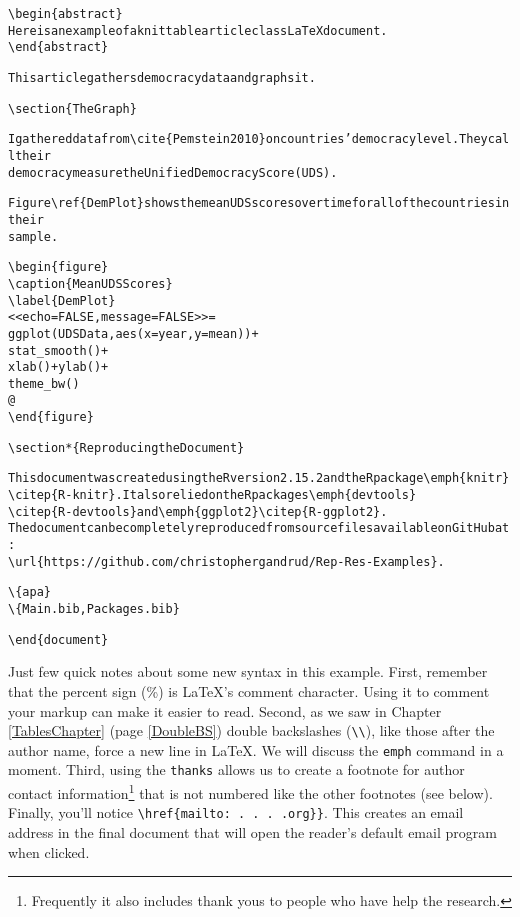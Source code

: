 {\begin{knitrout}
\begin{kframe}
\begin{alltt}
%%%%%%%%%%%%% Abstract %%%%%%%%%%%%%%%%%%%%
\textbackslash{}begin\{abstract\}
  Here is an example of a knittable article class LaTeX document.
\textbackslash{}end\{abstract\}

%%%%%%%%%%% Article Main Text %%%%%%%%%%%%%
This article gathers democracy data and graphs it. 

\textbackslash{}section\{The Graph\} 

I gathered data from \textbackslash{}cite\{Pemstein2010\} on countries' democracy level. They call their 
democracy measure the Unified Democracy Score (UDS).

Figure \textbackslash{}ref\{DemPlot\} shows the mean UDS scores over time for all of the countries in their 
sample.

\textbackslash{}begin\{figure\}
    \textbackslash{}caption\{Mean UDS Scores\}
    \textbackslash{}label\{DemPlot\}
\textless{}\textless{}echo=FALSE, message=FALSE\textgreater{}\textgreater{}=
ggplot(UDSData, aes(x = year, y = mean)) +
        stat_smooth() +
        xlab() + ylab() +
        theme\_bw()
@
\textbackslash{}end\{figure\}

%%%%%%%%%%%%% Reproducing the Document %%%%%%%%%%%%%
\textbackslash{}section*\{Reproducing the Document\}

This document was created using the R version 2.15.2 and the R package \textbackslash{}emph\{knitr\} 
\textbackslash{}citep\{R-knitr\}. It also relied on the R packages \textbackslash{}emph\{devtools\} 
\textbackslash{}citep\{R-devtools\} and \textbackslash{}emph\{ggplot2\} \textbackslash{}citep\{R-ggplot2\}. 
The document can be completely reproduced from source files available on GitHub at: 
\textbackslash{}url\{https://github. com/christophergandrud/Rep-Res-Examples\}.

%%%%%%%%% Bibliography %%%%%%%%%%%%%%%%%%%%
\textbackslash{}\{apa\}
\textbackslash{}\{Main.bib,Packages.bib\}

\textbackslash{}end\{document\}
        \end{alltt}
\end{kframe}
\end{knitrout}
}

\noindent Just few quick notes about some new syntax in this example. First, remember that the percent sign (\%) is LaTeX's comment character. Using it to comment your markup can make it easier to read. Second, as we saw in Chapter \ref{TablesChapter} (page \ref{DoubleBS}) double backslashes (\verb|\\|), like those after the author name, force a new line in LaTeX. We will discuss the \texttt{emph} command in a moment. Third, using the \texttt{thanks} allows us to create a footnote for author contact information\footnote{Frequently it also includes thank yous to people who have help the research.} that is not numbered like the other footnotes (see below). Finally, you'll notice \verb|\href{mailto: . . . .org}}|. This creates an email address in the final document that will open the reader's default email program when clicked. 

